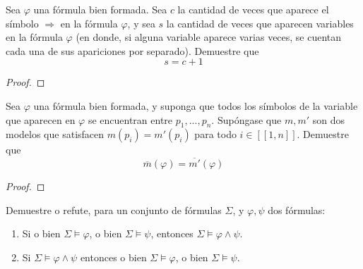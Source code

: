 \documentclass[12pt]{report}
\theoremstyle{largebreak}
\newcommand\natint[1]{\ensuremath{\left[\!\left[ #1\right]\!\right]}}
\begin{document}
    \begin{excer}
        Sea $\varphi$ una fórmula bien formada. Sea $c$ la cantidad de veces que aparece el símbolo $\Rightarrow$ en la fórmula $\varphi$, y sea $s$ la cantidad de veces que aparecen variables en la fórmula $\varphi$ (en donde, si alguna variable aparece varias veces, se cuentan cada una de sus apariciones por separado). Demuestre que
        \begin{equation*}
            s=c+1
        \end{equation*}
    \end{excer}

    \begin{proof}
    \end{proof}

    \begin{excer}
        Sea $\varphi$ una fórmula bien formada, y suponga que todos los símbolos de la variable que aparecen en $\varphi$ se encuentran entre $p_1,...,p_n$. Supóngase que $m,m'$ son dos modelos que satisfacen $m(p_i)=m'(p_i)$ para todo $i\in\natint{1,n}$. Demuestre que
        \begin{equation*}
            \overline{m}(\varphi)=\overline{m'}(\varphi)
        \end{equation*}
    \end{excer}

    \begin{proof}
    \end{proof}

    \begin{excer}
        Demuestre o refute, para un conjunto de fórmulas $\Sigma$, y $\varphi,\psi$ dos fórmulas:
        \begin{enumerate}
            \item Si o bien $\Sigma\vDash\varphi$, o bien $\Sigma\vDash\psi$, entonces $\Sigma\vDash\varphi\land\psi$.
            \item Si $\Sigma\vDash\varphi\land\psi$ entonces o bien $\Sigma\vDash\varphi$, o bien $\Sigma\vDash\psi$.
        \end{enumerate}
    \end{excer}
    
    \begin{sol}
    \end{sol}
\end{document}
